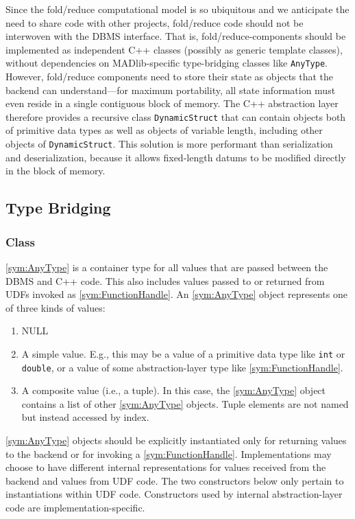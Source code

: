 Since the fold/reduce computational model is so ubiquitous and we anticipate the need to share code with other projects, fold/reduce code should not be interwoven with the DBMS interface. That is, fold/reduce-components should be implemented as independent C++ classes (possibly as generic template classes), without dependencies on MADlib-specific type-bridging classes like \texttt{AnyType}. However, fold/reduce components need to store their state as objects that the backend can understand---for maximum portability, all state information must even reside in a single contiguous block of memory. The C++ abstraction layer therefore provides a recursive class \texttt{DynamicStruct} that can contain objects both of primitive data types as well as objects of variable length, including other objects of \texttt{DynamicStruct}. This solution is more performant than serialization and deserialization, because it allows fixed-length datums to be modified directly in the block of memory.


\subsection{Type Bridging}

\subsubsection[Class AnyType]{Class }

\ref{sym:AnyType} is a container type for all values that are passed between the DBMS and C++ code. This also includes values passed to or returned from UDFs invoked as \ref{sym:FunctionHandle}. An \ref{sym:AnyType} object represents one of three kinds of values:
%
\begin{enumerate}
	\item NULL
	\item A simple value. E.g., this may be a value of a primitive data type like \texttt{int} or \texttt{double}, or a value of some abstraction-layer type like \ref{sym:FunctionHandle}.
	\item A composite value (i.e., a tuple). In this case, the \ref{sym:AnyType} object contains a list of other \ref{sym:AnyType} objects. Tuple elements are not named but instead accessed by index.
\end{enumerate}
%
\ref{sym:AnyType} objects should be explicitly instantiated only for returning values to the backend or for invoking a \ref{sym:FunctionHandle}. Implementations may choose to have different internal representations for values received from the backend and values from UDF code. The two constructors below only pertain to instantiations within UDF code. Constructors used by internal abstraction-layer code are implementation-specific.

